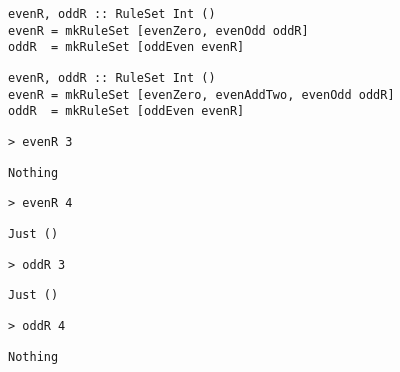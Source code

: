 \begin{frame}[fragile]
  \begin{verbatim}
evenR, oddR :: RuleSet Int ()
evenR = mkRuleSet [evenZero, evenOdd oddR]
oddR  = mkRuleSet [oddEven evenR]
  \end{verbatim}
\end{frame}

\begin{frame}[fragile]
  \begin{verbatim}
evenR, oddR :: RuleSet Int ()
evenR = mkRuleSet [evenZero, evenAddTwo, evenOdd oddR]
oddR  = mkRuleSet [oddEven evenR]
  \end{verbatim}
\end{frame}

\begin{frame}[fragile]
  \onslide<+->
  \begin{verbatim}
> evenR 3
  \end{verbatim}
  \onslide<+->
  \begin{verbatim}
Nothing
  \end{verbatim}

  \onslide<+->
  \begin{verbatim}
> evenR 4
  \end{verbatim}
  \onslide<+->
  \begin{verbatim}
Just ()
  \end{verbatim}

  \onslide<+->
  \begin{verbatim}
> oddR 3
  \end{verbatim}
  \onslide<+->
  \begin{verbatim}
Just ()
  \end{verbatim}

  \onslide<+->
  \begin{verbatim}
> oddR 4
  \end{verbatim}
  \onslide<+->
  \begin{verbatim}
Nothing
  \end{verbatim}
\end{frame}
